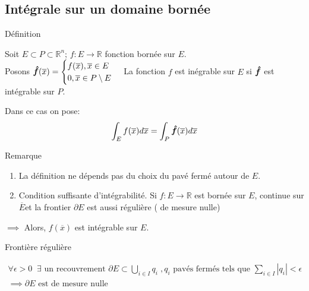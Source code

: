 \subsection{Intégrale sur un domaine bornée}
\begin{parag}{Définition}
    \begin{definition}
        Soit $E \subset P \subset \mathbb{R}^{n}$; $f: E \to \mathbb{R}$ fonction bornée sur $E$.\\
        Posons $\bhat{f}\left(\overline{x}\right) =  \begin{cases} f\left(\overline{x}\right), \overline{x} \in E\\ 0, \overline{x} \in P \setminus E \end{cases}$ La fonction $f$ est inégrable sur $E$ si $\bm{\hat{f}}$ est intégrable sur $P$.
    \end{definition}
    Dans ce cas on pose: 
    \begin{align*} \int_E f\left(\overline{x}\right) d\overline{x} =  \int_P \bhat{f}\left(\overline{x}\right) d\overline{x} \end{align*}
\end{parag}
\begin{parag}{Remarque}
    \begin{enumerate}
        \item La définition ne dépends pas du choix du pavé fermé autour de $E$.
        \item Condition suffisante d'intégrabilité. Si $f : E \to \mathbb{R}$ est bornée sur $E$, continue sur $\overline{E}$et la frontier $\partial E$ est aussi régulière ( de mesure nulle)
    \end{enumerate}
    $\implies $ Alors, $f\left(\overline{x}\right)$ est intégrable sur $E$.
    \begin{subparag}{Frontière régulière}
         \begin{definition}
            \begin{align*} 
                \forall \epsilon > 0\; \; \exists \text{ un recouvrement } \partial E \subset \bigcup_{i \in I}q_i\; , q_i \text{ pavés fermés tels que } \sum_{i \in I}\left|q_i\right| < \epsilon\\
                \implies \partial E \text{ est de mesure nulle }
            \end{align*}
         \end{definition}
    \end{subparag}
    
\end{parag}


